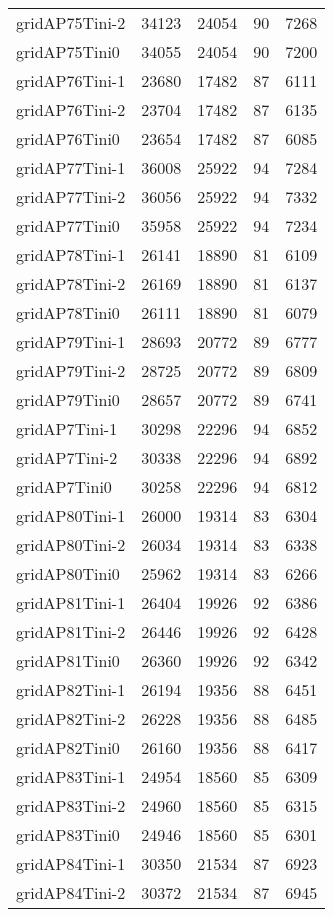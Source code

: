 \begin{longtable}{lrrrr}
gridAP75Tini-2 & 34123 & 24054 & 90 & 7268 \\
gridAP75Tini0 & 34055 & 24054 & 90 & 7200 \\
gridAP76Tini-1 & 23680 & 17482 & 87 & 6111 \\
gridAP76Tini-2 & 23704 & 17482 & 87 & 6135 \\
gridAP76Tini0 & 23654 & 17482 & 87 & 6085 \\
gridAP77Tini-1 & 36008 & 25922 & 94 & 7284 \\
gridAP77Tini-2 & 36056 & 25922 & 94 & 7332 \\
gridAP77Tini0 & 35958 & 25922 & 94 & 7234 \\
gridAP78Tini-1 & 26141 & 18890 & 81 & 6109 \\
gridAP78Tini-2 & 26169 & 18890 & 81 & 6137 \\
gridAP78Tini0 & 26111 & 18890 & 81 & 6079 \\
gridAP79Tini-1 & 28693 & 20772 & 89 & 6777 \\
gridAP79Tini-2 & 28725 & 20772 & 89 & 6809 \\
gridAP79Tini0 & 28657 & 20772 & 89 & 6741 \\
gridAP7Tini-1 & 30298 & 22296 & 94 & 6852 \\
gridAP7Tini-2 & 30338 & 22296 & 94 & 6892 \\
gridAP7Tini0 & 30258 & 22296 & 94 & 6812 \\
gridAP80Tini-1 & 26000 & 19314 & 83 & 6304 \\
gridAP80Tini-2 & 26034 & 19314 & 83 & 6338 \\
gridAP80Tini0 & 25962 & 19314 & 83 & 6266 \\
gridAP81Tini-1 & 26404 & 19926 & 92 & 6386 \\
gridAP81Tini-2 & 26446 & 19926 & 92 & 6428 \\
gridAP81Tini0 & 26360 & 19926 & 92 & 6342 \\
gridAP82Tini-1 & 26194 & 19356 & 88 & 6451 \\
gridAP82Tini-2 & 26228 & 19356 & 88 & 6485 \\
gridAP82Tini0 & 26160 & 19356 & 88 & 6417 \\
gridAP83Tini-1 & 24954 & 18560 & 85 & 6309 \\
gridAP83Tini-2 & 24960 & 18560 & 85 & 6315 \\
gridAP83Tini0 & 24946 & 18560 & 85 & 6301 \\
gridAP84Tini-1 & 30350 & 21534 & 87 & 6923 \\
gridAP84Tini-2 & 30372 & 21534 & 87 & 6945 \\

\end{longtable}
